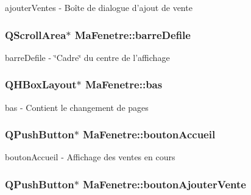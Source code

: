 ajouter\-Ventes -\/ Boîte de dialogue d'ajout de vente 

\hypertarget{class_ma_fenetre_a4f199f65ae682c48c837875a486d2f3f}{
\subsubsection[{barre\-Defile}]{\setlength{\rightskip}{0pt plus 5cm}Q\-Scroll\-Area$\ast$ Ma\-Fenetre\-::barre\-Defile\hspace{0.3cm}{\ttfamily [protected]}}}\label{class_ma_fenetre_a4f199f65ae682c48c837875a486d2f3f}


barre\-Defile -\/ \char`\"{}\-Cadre\char`\"{} du centre de l'affichage 

\hypertarget{class_ma_fenetre_aff3315e53711db117feadab319660cee}{
\subsubsection[{bas}]{\setlength{\rightskip}{0pt plus 5cm}Q\-H\-Box\-Layout$\ast$ Ma\-Fenetre\-::bas\hspace{0.3cm}{\ttfamily [protected]}}}\label{class_ma_fenetre_aff3315e53711db117feadab319660cee}


bas -\/ Contient le changement de pages 

\hypertarget{class_ma_fenetre_a0316aa06b89b812a8528a8ccbe81561a}{
\subsubsection[{bouton\-Accueil}]{\setlength{\rightskip}{0pt plus 5cm}Q\-Push\-Button$\ast$ Ma\-Fenetre\-::bouton\-Accueil\hspace{0.3cm}{\ttfamily [protected]}}}\label{class_ma_fenetre_a0316aa06b89b812a8528a8ccbe81561a}


bouton\-Accueil -\/ Affichage des ventes en cours 

\hypertarget{class_ma_fenetre_a422d1e619aa51ff42b5ecd2c5476ce19}{
\subsubsection[{bouton\-Ajouter\-Vente}]{\setlength{\rightskip}{0pt plus 5cm}Q\-Push\-Button$\ast$ Ma\-Fenetre\-::bouton\-Ajouter\-Vente\hspace{0.3cm}{\ttfamily [protected]}}}\label{class_ma_fenetre_a422d1e619aa51ff42b5ecd2c5476ce19}


